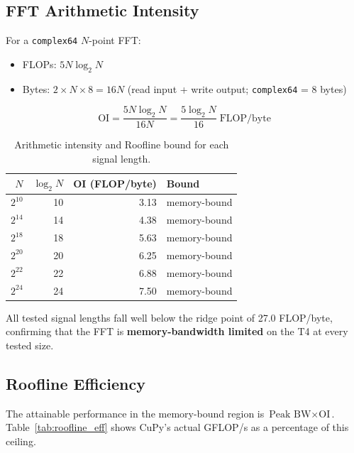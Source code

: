 \documentclass[12pt, letterpaper]{article}
\begin{document}
\subsection{FFT Arithmetic Intensity}

For a \texttt{complex64} $N$-point FFT:
\begin{itemize}
    \item FLOPs: $5N\log_2 N$
    \item Bytes: $2 \times N \times 8 = 16N$ \; (read input + write output; \texttt{complex64} = 8 bytes)
\end{itemize}

\begin{equation}
    \text{OI} = \frac{5N\log_2 N}{16N} = \frac{5\log_2 N}{16} \;\text{FLOP/byte}
\end{equation}

\begin{table}[H]
\centering
\caption{Arithmetic intensity and Roofline bound for each signal length.}
\begin{tabular}{@{}rrrl@{}}
\toprule
$N$ & $\log_2 N$ & OI (FLOP/byte) & Bound \\
\midrule
$2^{10}$ & 10 & 3.13 & memory-bound \\
$2^{14}$ & 14 & 4.38 & memory-bound \\
$2^{18}$ & 18 & 5.63 & memory-bound \\
$2^{20}$ & 20 & 6.25 & memory-bound \\
$2^{22}$ & 22 & 6.88 & memory-bound \\
$2^{24}$ & 24 & 7.50 & memory-bound \\
\bottomrule
\end{tabular}
\label{tab:oi}
\end{table}

All tested signal lengths fall well below the ridge point of 27.0 FLOP/byte, confirming that the FFT is \textbf{memory-bandwidth limited} on the T4 at every tested size.

\subsection{Roofline Efficiency}

The attainable performance in the memory-bound region is $\text{Peak BW} \times \text{OI}$. Table~\ref{tab:roofline_eff} shows CuPy's actual GFLOP/s as a percentage of this ceiling.
\end{document}
